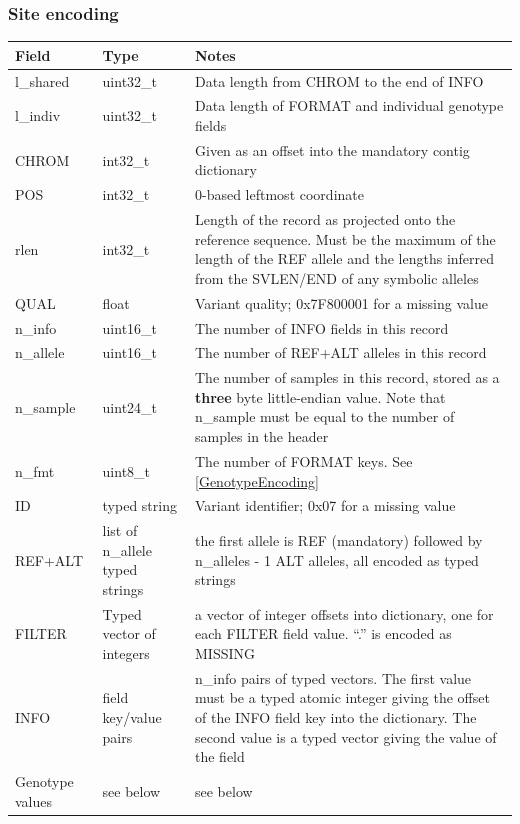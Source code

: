 \documentclass[8pt]{article}
\begin{document}
\subsubsection{Site encoding}
\label{BcfSiteEncoding}

{\small
\begin{tabular}{|l | l | p{30em} | } \hline
\textbf{Field} &	\textbf{Type} &	\textbf{Notes} \\ \hline
l\_shared & uint32\_t & Data length from CHROM to the end of INFO \\ \hline
l\_indiv  & uint32\_t & Data length of FORMAT and individual genotype fields \\ \hline
CHROM     & int32\_t  & Given as an offset into the mandatory contig dictionary \\ \hline
POS       & int32\_t  & 0-based leftmost coordinate \\ \hline
rlen      & int32\_t  & Length of the record as projected onto the reference sequence.
                        Must be the maximum of the length of the REF allele and the lengths
                        inferred from the SVLEN/END of any symbolic alleles \\ \hline
QUAL      & float     & Variant quality; 0x7F800001 for a missing value \\ \hline
n\_info   & uint16\_t & The number of INFO fields in this record \\ \hline
n\_allele & uint16\_t & The number of REF+ALT alleles in this record \\ \hline
n\_sample & uint24\_t & The number of samples in this record, stored as a \textbf{three} byte little-endian value.
                        Note that n\_sample must be equal to the number of samples in the header \\ \hline
n\_fmt    & uint8\_t  & The number of FORMAT keys.  See \ref{GenotypeEncoding} \\ \hline
ID       & typed string & Variant identifier; 0x07 for a missing value \\ \hline
REF+ALT  & list of n\_allele typed strings & the first allele is REF (mandatory) followed by n\_alleles - 1 ALT
                                             alleles, all encoded as typed strings \\ \hline
FILTER   & Typed vector of integers & a vector of integer offsets into dictionary, one for each FILTER field value.
                                      ``.'' is encoded as MISSING \\ \hline
INFO     & field key/value pairs & n\_info pairs of typed vectors.
                                   The first value must be a typed atomic integer giving the offset of the INFO field
                                   key into the dictionary.
                                   The second value is a typed vector giving the value of the field \\ \hline
Genotype values & see below & see below \\ \hline
\end{tabular}}
\end{document}
